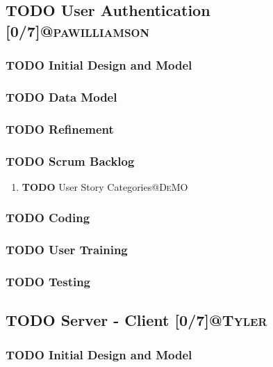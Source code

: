 \documentclass[11pt]{article}
\begin{document}
\subsection{{\bfseries\sffamily TODO} User Authentication [0/7]\hfill{}\textsc{@pawilliamson}}
\label{sec:orge8001e2}
\subsubsection{{\bfseries\sffamily TODO} Initial Design and Model}
\label{sec:org53b235b}
\subsubsection{{\bfseries\sffamily TODO} Data Model}
\label{sec:orgebe788a}
\subsubsection{{\bfseries\sffamily TODO} Refinement}
\label{sec:org4fc9bff}
\subsubsection{{\bfseries\sffamily TODO} Scrum Backlog}
\label{sec:orgf4efbe0}
\begin{enumerate}
\item {\bfseries\sffamily TODO} User Story Categories\hfill{}\textsc{@DeMO}
\label{sec:org2314b80}
\end{enumerate}
\subsubsection{{\bfseries\sffamily TODO} Coding}
\label{sec:orgbd8ae53}
\subsubsection{{\bfseries\sffamily TODO} User Training}
\label{sec:org1856922}
\subsubsection{{\bfseries\sffamily TODO} Testing}
\label{sec:org27a128b}
\subsection{{\bfseries\sffamily TODO} Server - Client [0/7]\hfill{}\textsc{@Tyler}}
\label{sec:orgde6549b}
\subsubsection{{\bfseries\sffamily TODO} Initial Design and Model}
\label{sec:org16db1e6}
\end{document}
